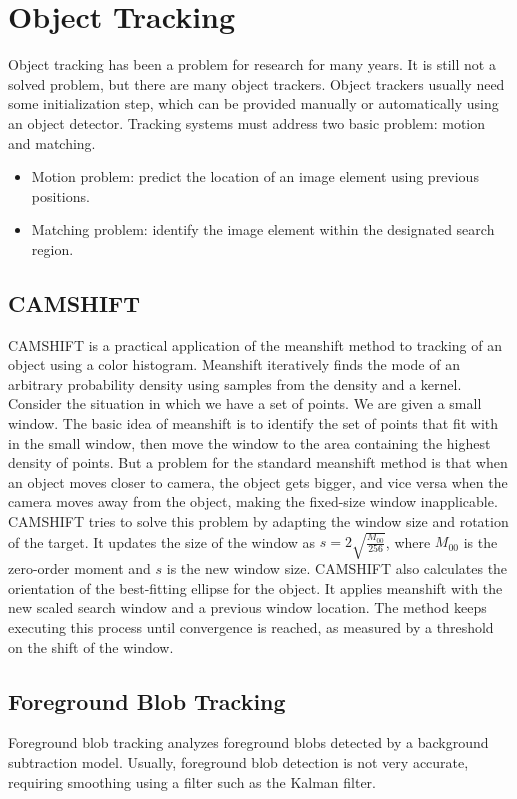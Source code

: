 \section{Object Tracking}
\label{Tracking}
Object tracking has been a problem for research for many years. It is still not a solved problem, but there are many object trackers. Object trackers usually need some initialization step, which can be provided manually or automatically using an object detector. Tracking systems must address two basic problem: motion and matching.
\begin{itemize}
	\item Motion problem: predict the location of an image element using previous positions.
	\item Matching problem: identify the image element within the designated search region.
\end{itemize}

\subsection{CAMSHIFT}
CAMSHIFT is a practical application of the meanshift method to tracking of an object using a color histogram. Meanshift iteratively finds the mode of an arbitrary probability density using samples from the density and a kernel. Consider the situation in which we have a set of points. We are given a small window. The basic idea of meanshift is to identify the set of points that fit with in the small window, then move the window to the area containing the highest density of points. But a problem for the standard meanshift method is that when an object moves closer to camera, the object gets bigger, and vice versa when the camera moves away from the object, making the fixed-size window inapplicable. CAMSHIFT tries to solve this problem by adapting the window size and rotation of the target. It updates the size of the window as $ s = 2 \sqrt{\frac{M_{00}}{256}} $, where $M_{00}$ is the zero-order moment and $ s $ is the new window size. CAMSHIFT also calculates the orientation of the best-fitting ellipse for the object. It applies meanshift with the new scaled search window and a previous window location. The method keeps executing this process until convergence is reached, as measured by a threshold on the shift of the window.

\subsection{Foreground Blob Tracking}
Foreground blob tracking analyzes foreground blobs detected by a background subtraction model. Usually, foreground blob detection is not very accurate, requiring smoothing using a filter such as the Kalman filter.

